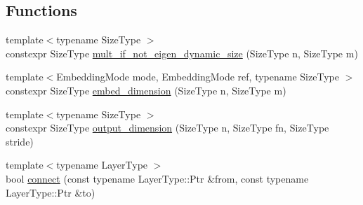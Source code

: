 \subsection*{Functions}
\begin{DoxyCompactItemize}
\item 
{\footnotesize template$<$typename Size\-Type $>$ }\\constexpr Size\-Type \hyperlink{namespaceffnn_1_1layer_adec527cca25d8f9bb34d0efe280bc164}{mult\-\_\-if\-\_\-not\-\_\-eigen\-\_\-dynamic\-\_\-size} (Size\-Type n, Size\-Type m)
\item 
{\footnotesize template$<$Embedding\-Mode mode, Embedding\-Mode ref, typename Size\-Type $>$ }\\constexpr Size\-Type \hyperlink{namespaceffnn_1_1layer_ad128f693900faa5bcf2cdd0ef8e7eee6}{embed\-\_\-dimension} (Size\-Type n, Size\-Type m)
\item 
{\footnotesize template$<$typename Size\-Type $>$ }\\constexpr Size\-Type \hyperlink{namespaceffnn_1_1layer_ac1d8b4e852293231055d1257f1e83e60}{output\-\_\-dimension} (Size\-Type n, Size\-Type fn, Size\-Type stride)
\item 
{\footnotesize template$<$typename Layer\-Type $>$ }\\bool \hyperlink{namespaceffnn_1_1layer_a33fc9c6c7eb5fbdef14e0aa0db97dd13}{connect} (const typename Layer\-Type\-::\-Ptr \&from, const typename Layer\-Type\-::\-Ptr \&to)
\end{DoxyCompactItemize}


